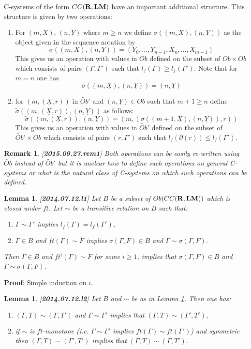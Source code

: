 \documentclass[11pt]{article}
\newenvironment{proof}{{\bf Proof}:}{\vskip 5mm }
\newtheorem{lemma}[proposition]{Lemma}
\newtheorem{remark}[proposition]{Remark}
\newcommand{\llabel}[1]{\label{#1}[{\bf #1}]}
\newcommand{\rr}{{\bf R}}
\newcommand{\lm}{{\bf LM}}
\newcommand{\uu}{\underline}
\newcommand{\wt}{\widetilde}
\begin{document}
C-systems of the form $CC(\rr,\lm)$ have an important additional structure. This structure is given by two operations:
%
\begin{enumerate}
\item For $(m,\uu{X})$, $(n,\uu{Y})$ where $m\ge n$ we define $\sigma((m,\uu{X}),(n,\uu{Y}))$ as the object given in the sequence notation by 
%
$$\sigma((m,\uu{X}),(n,\uu{Y}))=(Y_0,\dots,Y_{n-1},X_n,\dots,X_{m-1})$$
%
This gives us an operation with values in $Ob$ defined on the subset of $Ob\times Ob$ which consists of pairs $(\Gamma,\Gamma')$ such that $l_f(\Gamma)\ge l_f(\Gamma')$. Note that for $m=n$ one has 
%
$$\sigma((m,\uu{X}),(n,\uu{Y}))=(n,\uu{Y})$$
%
\item for $(m,(\uu{X},r))$ in $\wt{Ob}'$ and $(n,\uu{Y})\in Ob$ such that $m+1\ge n$ define $\wt{\sigma}((m,(\uu{X},r)),(n,\uu{Y}))$ as follows:
%
$$\wt{\sigma}((m,(\uu{X},r)),(n,\uu{Y}))=(m, (\sigma((m+1,\uu{X}),(n,\uu{Y})),r))$$
%
This gives us an operation with values in $\wt{Ob}'$ defined on the subset of $\wt{Ob}'\times Ob$ which consists of pairs $(r,\Gamma')$ such that $l_f(\partial(r))\le l_f(\Gamma')$.
\end{enumerate}
%
\begin{remark}\rm
\llabel{2015.09.27.rem1}
Both operations can be easily re-written using $\wt{Ob}$ instead of $\wt{Ob}'$ but it is unclear how to define such operations on general C-systems or what is the natural class of C-systems on which such operations can be defined. 
\end{remark}
%
\begin{lemma}
\llabel{2014.07.12.l1}
Let $B$ be a subset of $Ob(CC(\rr,\lm))$ which is closed under $ft$. Let $\sim$ be a transitive relation on $B$ such that:
%
\begin{enumerate}
\item $\Gamma\sim \Gamma'$ implies $l_f(\Gamma)=l_f(\Gamma')$,
\item $\Gamma\in B$ and $ft(\Gamma)\sim F$ implies $\sigma(\Gamma,F)\in B$ and $\Gamma\sim \sigma(\Gamma,F)$.
\end{enumerate}
%
Then $\Gamma\in B$ and $ft^i(\Gamma)\sim F$ for some $i\ge 1$, implies that $\sigma(\Gamma,F)\in B$ and $\Gamma\sim \sigma(\Gamma,F)$. 
\end{lemma}
%
\begin{proof}
Simple induction on $i$.
\end{proof}
%
\begin{lemma}
\llabel{2014.07.12.l2}
Let $B$ and $\sim$ be as in Lemma \ref{2014.07.12.l1}. Then one has:
%
\begin{enumerate}
\item $(\Gamma,T)\sim (\Gamma,T')$ and $\Gamma\sim \Gamma'$ implies that $(\Gamma,T)\sim (\Gamma',T')$,
\item if $\sim$ is $ft$-monotone (i.e. $\Gamma\sim \Gamma'$ implies $ft(\Gamma)\sim ft(\Gamma')$) and symmetric then $(\Gamma,T)\sim (\Gamma',T')$ implies that $(\Gamma,T)\sim (\Gamma,T')$.
\end{enumerate}
\end{lemma}
\end{document}
